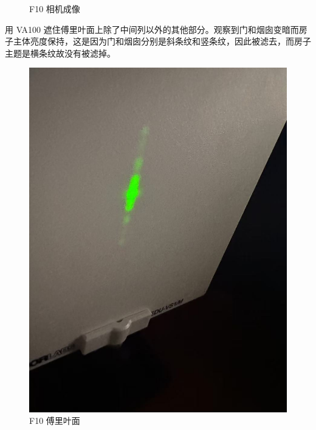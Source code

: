 \documentclass{ctexart}
\begin{document}
\begin{figure}[H]
\begin{minipage}[b]{0.3\textwidth}
    \caption{F10 相机成像}
  \end{minipage}
\end{figure}

用 VA100 遮住傅里叶面上除了中间列以外的其他部分。观察到门和烟囱变暗而房子主体亮度保持，这是因为门和烟囱分别是斜条纹和竖条纹，因此被滤去，而房子主题是横条纹故没有被滤掉。
\begin{figure}[H]
  \centering
  \begin{minipage}[b]{0.2\textwidth}
    \centering
    \includegraphics[width=\textwidth]{pictures/微信图片_20241017164842.jpg}
    \caption{F10 傅里叶面}
  \end{minipage}
  \hspace{0.1\textwidth} %
  \begin{minipage}[b]{0.3\textwidth}
    \centering

\end{minipage}
\end{figure}
\end{document}
